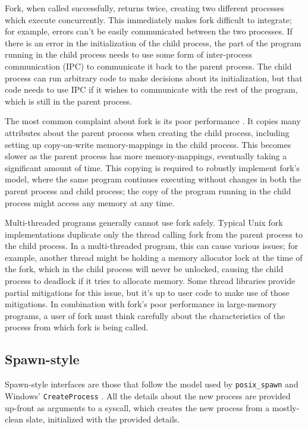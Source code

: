 \documentclass{acmart}
\begin{document}
Fork, when called successfully, returns twice,
creating two different processes which execute concurrently.
This immediately makes fork difficult to integrate;
for example, errors can't be easily communicated between the two processes.
If there is an error in the initialization of the child process,
the part of the program running in the child process
needs to use some form of inter-process communication (IPC) to communicate it back to the parent process.
The child process can run arbitrary code to make decisions about its initialization,
but that code needs to use IPC if it wishes to communicate with the rest of the program,
which is still in the parent process.

The most common complaint about fork is its poor performance \cite{forkroad}.
It copies many attributes about the parent process when creating the child process,
including setting up copy-on-write memory-mappings in the child process.
This becomes slower as the parent process has more memory-mappings,
eventually taking a significant amount of time.
This copying is required to robustly implement fork's model,
where the same program continues executing without changes in both the parent process and child process;
the copy of the program running in the child process might access any memory at any time.

Multi-threaded programs generally cannot use fork safely.
Typical Unix fork implementations duplicate only the thread calling fork from the parent process to the child process.
In a multi-threaded program, this can cause various issues;
for example, another thread might be holding a memory allocator lock at the time of the fork,
which in the child process will never be unlocked,
causing the child process to deadlock if it tries to allocate memory.
Some thread libraries provide partial mitigations for this issue,
but it's up to user code to make use of those mitigations.
In combination with fork's poor performance in large-memory programs,
a user of fork must think carefully
about the characteristics of the process from which fork is being called.
\subsection{Spawn-style}
Spawn-style interfaces are those that follow the model used by \texttt{posix\_spawn} \cite{posix_spawn}
and Windows' \texttt{CreateProcess} \cite{create_process}.
All the details about the new process are provided up-front as arguments to a syscall,
which creates the new process from a mostly-clean slate, initialized with the provided details.
\end{document}
